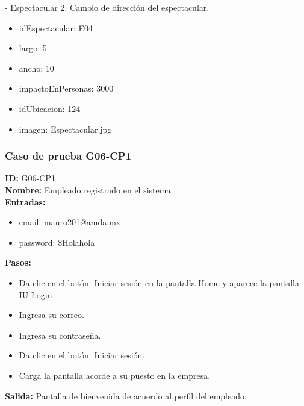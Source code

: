 - Espectacular 2. Cambio de dirección del espectacular.
\begin{itemize}
    \item idEspectacular: E04
    \item largo: 5
    \item ancho: 10
    \item impactoEnPersonas: 3000
    \item idUbicacion: 124
    \item imagen: Espectacular.jpg
\end{itemize}

\subsubsection{Caso de prueba G06-CP1}
\textbf{ID:} G06-CP1\\
\textbf{Nombre:} Empleado registrado en el sistema.\\
\textbf{Entradas:} 
\begin{itemize}
    \item email: mauro201@amda.mx
    \item password: \$Holahola\\
\end{itemize}
\textbf{Pasos:}
\begin{itemize}
    \item Da clic en el botón: Iniciar sesión en la pantalla \hyperlink{IU:IU-HOME}{Home} y aparece la pantalla \hyperlink{IU:IU-Login}{IU-Login}
    \item Ingresa su correo.
    \item Ingresa su contraseña.
    \item Da clic en el botón: Iniciar sesión.
    \item Carga la pantalla acorde a su puesto en la empresa.
\end{itemize}
\textbf{Salida:}
Pantalla de bienvenida de acuerdo al perfil del empleado.

